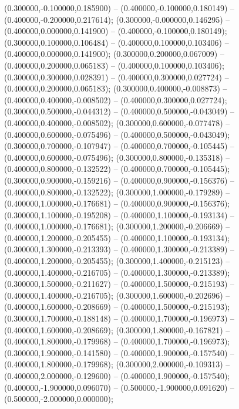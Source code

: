  (0.300000,-0.100000,0.185900) -- (0.400000,-0.100000,0.180149) -- (0.400000,-0.200000,0.217614);
 (0.300000,-0.000000,0.146295) -- (0.400000,0.000000,0.141900) -- (0.400000,-0.100000,0.180149);
 (0.300000,0.100000,0.106484) -- (0.400000,0.100000,0.103406) -- (0.400000,0.000000,0.141900);
 (0.300000,0.200000,0.067009) -- (0.400000,0.200000,0.065183) -- (0.400000,0.100000,0.103406);
 (0.300000,0.300000,0.028391) -- (0.400000,0.300000,0.027724) -- (0.400000,0.200000,0.065183);
 (0.300000,0.400000,-0.008873) -- (0.400000,0.400000,-0.008502) -- (0.400000,0.300000,0.027724);
 (0.300000,0.500000,-0.044312) -- (0.400000,0.500000,-0.043049) -- (0.400000,0.400000,-0.008502);
 (0.300000,0.600000,-0.077478) -- (0.400000,0.600000,-0.075496) -- (0.400000,0.500000,-0.043049);
 (0.300000,0.700000,-0.107947) -- (0.400000,0.700000,-0.105445) -- (0.400000,0.600000,-0.075496);
 (0.300000,0.800000,-0.135318) -- (0.400000,0.800000,-0.132522) -- (0.400000,0.700000,-0.105445);
 (0.300000,0.900000,-0.159216) -- (0.400000,0.900000,-0.156376) -- (0.400000,0.800000,-0.132522);
 (0.300000,1.000000,-0.179289) -- (0.400000,1.000000,-0.176681) -- (0.400000,0.900000,-0.156376);
 (0.300000,1.100000,-0.195208) -- (0.400000,1.100000,-0.193134) -- (0.400000,1.000000,-0.176681);
 (0.300000,1.200000,-0.206669) -- (0.400000,1.200000,-0.205455) -- (0.400000,1.100000,-0.193134);
 (0.300000,1.300000,-0.213393) -- (0.400000,1.300000,-0.213389) -- (0.400000,1.200000,-0.205455);
 (0.300000,1.400000,-0.215123) -- (0.400000,1.400000,-0.216705) -- (0.400000,1.300000,-0.213389);
 (0.300000,1.500000,-0.211627) -- (0.400000,1.500000,-0.215193) -- (0.400000,1.400000,-0.216705);
 (0.300000,1.600000,-0.202696) -- (0.400000,1.600000,-0.208669) -- (0.400000,1.500000,-0.215193);
 (0.300000,1.700000,-0.188148) -- (0.400000,1.700000,-0.196973) -- (0.400000,1.600000,-0.208669);
 (0.300000,1.800000,-0.167821) -- (0.400000,1.800000,-0.179968) -- (0.400000,1.700000,-0.196973);
 (0.300000,1.900000,-0.141580) -- (0.400000,1.900000,-0.157540) -- (0.400000,1.800000,-0.179968);
 (0.300000,2.000000,-0.109313) -- (0.400000,2.000000,-0.129600) -- (0.400000,1.900000,-0.157540);
 (0.400000,-1.900000,0.096070) -- (0.500000,-1.900000,0.091620) -- (0.500000,-2.000000,0.000000);
